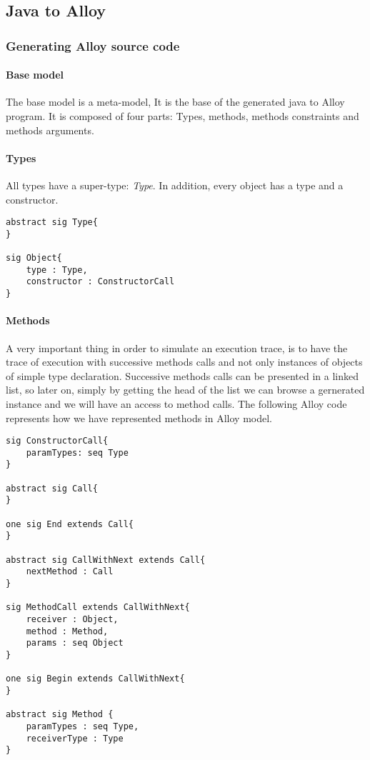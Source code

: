 \subsection{Java to Alloy}
\subsubsection{Generating Alloy source code}
\paragraph{Base model}
The base model is a meta-model, It is the base of the generated java to Alloy program.
It is composed of four parts: Types, methods, methods constraints and methods arguments.

\lstset{language=Alloy}

\paragraph{Types} All types have a super-type: \textit{Type}. In addition, every object has a type and a constructor.
\begin{lstlisting}
abstract sig Type{
}

sig Object{
    type : Type,
    constructor : ConstructorCall
}
\end{lstlisting}

\paragraph{Methods} A very important thing in order  to simulate an execution trace, is to have the trace of execution with successive methods calls and not only instances of objects of simple type declaration. Successive methods calls can be presented in a linked list, so later on, simply by getting the head of the list we can browse a gernerated instance and we will have an access to method calls. The following Alloy code represents how we have represented methods in Alloy model.

\begin{lstlisting}
sig ConstructorCall{
    paramTypes: seq Type
}

abstract sig Call{
}

one sig End extends Call{
}

abstract sig CallWithNext extends Call{
    nextMethod : Call
}

sig MethodCall extends CallWithNext{
    receiver : Object,
    method : Method,
    params : seq Object
}

one sig Begin extends CallWithNext{
}

abstract sig Method {
    paramTypes : seq Type,
    receiverType : Type
}
\end{lstlisting}

